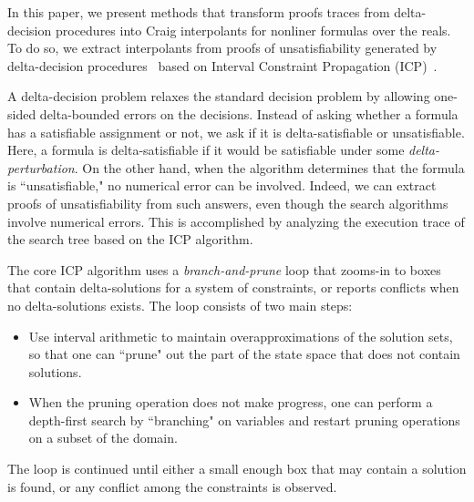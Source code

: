 In this paper, we present methods that transform proofs traces from delta-decision procedures into Craig interpolants for nonliner formulas over the reals. To do so, we extract interpolants from proofs of unsatisfiability generated by delta-decision procedures~\cite{DBLP:conf/synasc/GaoKC14} based on Interval Constraint Propagation (ICP)~\cite{}. 

A delta-decision problem relaxes the standard decision problem by allowing one-sided delta-bounded errors on the decisions. Instead of asking whether a formula has a satisfiable assignment or not, we ask if it is delta-satisfiable or unsatisfiable. Here, a formula is delta-satisfiable if it would be satisfiable under some {\em delta-perturbation}. On the other hand, when the algorithm determines that the formula is ``unsatisfiable," no numerical error can be involved. Indeed, we can extract proofs of unsatisfiability from such answers, even though the search algorithms involve numerical errors. This is accomplished by analyzing the execution trace of the search tree based on the ICP algorithm. 

The core ICP algorithm uses a {\em branch-and-prune} loop that zooms-in to boxes that contain delta-solutions for a system of constraints, or reports conflicts when no delta-solutions exists. The loop consists of two main steps:
\begin{itemize}
\item Use interval arithmetic to maintain overapproximations of the solution sets, so that one can ``prune" out the part of the state space that does not contain solutions.
\item When the pruning operation does not make progress, one can perform a depth-first search by ``branching" on variables and restart pruning operations on a subset of the domain. 
\end{itemize}
The loop is continued until either a small enough box that may contain a solution is found, or any conflict among the constraints is observed.

